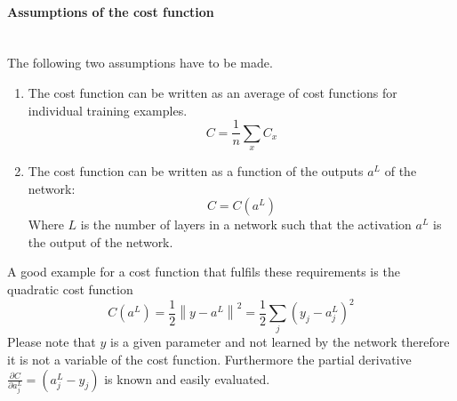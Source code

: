 				\paragraph{Assumptions of the cost function}
					~\\ The following two assumptions have to be made.
					\begin{enumerate}
						\item The cost function can be written as an average of cost functions for individual training examples.
						\begin{equation}
							C = \frac{1}{n} \sum_{x} C_x
							\label{EQ:CostCond1}
						\end{equation}
						\item The cost function can be written as a function of the outputs $a^L$ of the network:
						\begin{equation}
							C = C(a^L)
						\end{equation}
						Where $L$ is the number of layers in a network such that the activation $a^L$ is the output of the network.
					\end{enumerate}
					A good example for a cost function that fulfils these requirements is the quadratic cost function
					\begin{equation}
						C(a^L) = \frac{1}{2} \left\| y - a^L \right\|^2 = \frac{1}{2} \sum_j \left(y_j -a^L_j \right)^2
						\label{EQ:Cost2}
					\end{equation}
					Please note that $y$ is a given parameter and not learned by the network therefore it is not a variable of the cost function. Furthermore the partial derivative $\frac{\partial C}{\partial a^L_j} = (a^L_j -y_j)$ is known and easily evaluated. 
